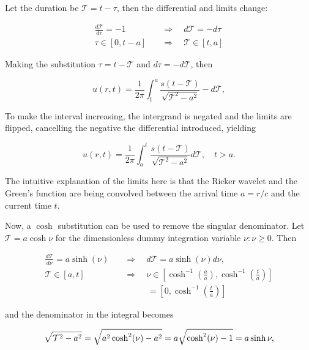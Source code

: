 \documentclass[final-report]{report-template}
\begin{document}
Let the duration be $\mathcal{T} = t - \tau$, then the differential and limits change:

\begin{align*}
    \frac{d\mathcal{T}}{d\tau} = -1 &\quad \Longrightarrow \quad d\mathcal{T} = -d\tau\\
    \tau \in [0, t-a] &\quad \Longrightarrow \quad  \mathcal{T} \in [t, a]
\end{align*}

Making the substitution $\tau = t - \mathcal{T}$ and $d\tau = -d\mathcal{T}$, then

\begin{equation}
    u(r, t) = \frac{1}{2\pi} \int^{a}_t \frac{s(t-\mathcal{T})}{\sqrt{\mathcal{T}^2 - a^2}} -d\mathcal{T},
\end{equation}

To make the interval increasing, the intergrand is negated and the limits are flipped, cancelling the negative the differential introduced, yielding

\begin{equation}
    u(r, t) = \frac{1}{2\pi} \int^t_a \frac{s(t-\mathcal{T})}{\sqrt{\mathcal{T}^2 - a^2}} d\mathcal{T}, \quad t > a.
\end{equation}

The intuitive explanation of the limits here is that the Ricker wavelet and the Green's function are being convolved between the arrival time $a = r/c$ and the current time $t$.

Now, a $\cosh$ substitution can be used to remove the singular denominator. Let $\mathcal{T} = a\cosh{\nu}$ for the dimensionless dummy integration variable $\nu: \nu \geq 0$. Then

\begin{align}
    \frac{d\mathcal{T}}{d\nu} = a\sinh(\nu) \quad &\Rightarrow \quad d\mathcal{T} = a\sinh(\nu) d\nu,\\
    \mathcal{T} \in [a, t] \quad &\Rightarrow \quad \nu \in \left[\cosh^{-1}\left(\frac{a}{a}\right), \cosh^{-1}\left(\frac{t}{a}\right)\right] \\ & \qquad \ \ \ = \left[0, \cosh^{-1}\left(\frac{t}{a}\right)\right] 
\end{align}

and the denominator in the integral becomes

\begin{equation}
    \sqrt{\mathcal{T}^2 - a^2} = \sqrt{a^2\cosh^2(\nu) - a^2}  = a\sqrt{\cosh^2(\nu) - 1}\\
    = a\sinh{\nu},
\end{equation}
\end{document}

